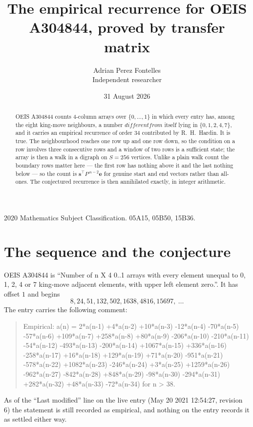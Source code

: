 \documentclass[11pt,a4paper]{article}
\title{The empirical recurrence for OEIS A304844, proved by transfer matrix}
\author{Adrian Perez Fontelles\\ \small Independent researcher}
\date{31 August 2026}
\theoremstyle{plain}
\theoremstyle{definition}
\begin{document}
\maketitle

\begin{abstract}
OEIS A304844 counts $4$-column arrays over $\{0,\dots,1\}$ in which every entry has,
among the eight king-move neighbours, a number $different from$ itself lying in $\{0,1,2,4,7\}$, and it carries an empirical
recurrence of order $34$ contributed by R.~H.~Hardin. It is true. The neighbourhood
reaches one row up and one row down, so the condition on a row involves three consecutive
rows and a window of two rows is a sufficient state; the array is then a walk in a digraph
on $S=256$ vertices. Unlike a plain walk count the boundary rows matter here --- the first
row has nothing above it and the last nothing below --- so the count is
$\mathbf{s}^{\!\top}P^{\,n-2}\mathbf{e}$ for genuine start and end vectors rather than
all-ones. The conjectured recurrence is then annihilated exactly, in integer arithmetic.
\end{abstract}

\noindent\small 2020 Mathematics Subject Classification. 05A15, 05B50, 15B36.\normalsize

\section{The sequence and the conjecture}

OEIS A304844 is ``Number of n X 4 0..1 arrays with every element unequal to 0, 1, 2, 4 or 7 king-move adjacent elements, with upper left element zero.''. It has offset
$1$ and begins
\[
8, 24, 51, 132, 502, 1638, 4816, 15697,\ \dots
\]
The entry carries the following comment:
\begin{quote}\small
Empirical: a(n) = 2*a(n-1) +4*a(n-2) +10*a(n-3) -12*a(n-4) -70*a(n-5) -57*a(n-6) +109*a(n-7) +258*a(n-8) +80*a(n-9) -206*a(n-10) -210*a(n-11) -54*a(n-12) -493*a(n-13) -200*a(n-14) +1067*a(n-15) +336*a(n-16) -258*a(n-17) +16*a(n-18) +129*a(n-19) +71*a(n-20) -951*a(n-21) -578*a(n-22) +1082*a(n-23) -246*a(n-24) +3*a(n-25) +1259*a(n-26) -962*a(n-27) -842*a(n-28) +848*a(n-29) -98*a(n-30) -294*a(n-31) +282*a(n-32) +48*a(n-33) -72*a(n-34) for n > 38.
\end{quote}
As of the ``Last modified'' line on the live entry (May 20 2021 12:54:27, revision
6) the statement is still recorded as empirical, and nothing on the entry
records it as settled either way.
\end{document}

